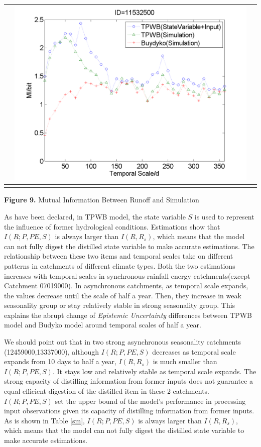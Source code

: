 \documentclass[draft,wrr]{AGUTeX}
\begin{document}
\begin{article}
\begin{table}[H]
{\begin{tabular}{ccc}
&\begin{minipage}{.6\textwidth}\includegraphics[width=\linewidth]{resultgraph/11532500MI.png}\end{minipage}
\\
\hline
\\
\end{tabular}
}
\Large{\textbf{Figure 9.} Mutual Information Between Runoff and Simulation}
\end{table}

As have been declared, in TPWB model,  the state variable $S$ is used to  represent the influence of former hydrological conditions. Estimations show that $I(R;P,PE,S)$ is always larger than $I(R,R_s)$, which means that 
the model can not fully  digest the distilled state variable to make accurate estimations. The relationship between these two items and temporal scales take on different patterns in catchments of different climate types. Both the two estimations increases with temporal scales in synchronous rainfall energy catchments(except Catchment 07019000). In asynchronous catchments, as temporal scale expands, the values decrease until the scale of half a year. Then, they increase in weak seasonality group or stay relatively stable in strong seasonality group. This explains the abrupt change of \emph{Epistemic Uncertainty} differences between TPWB model and Budyko model around temporal scales of half a year. 

We should point out that in two strong asynchronous seasonality catchments (12459000,13337000), although $I(R;P,PE,S)$ decreases as temporal scale expands from 10 days to half a year, $I(R,R_s)$ is much smaller than $I(R;P,PE,S)$. It stays low and relatively stable as temporal scale expands. The strong  capacity of distilling information from former inputs does not guarantee a equal efficient digestion of the distilled item in these 2 catchments. 
\iffalse
$I(R;P,PE,S)$ set the upper bound of the model's performance in processing input observations given its capacity of distilling information from former inputs. As is shown in Table \ref{sm}, $I(R;P,PE,S)$ is always larger than $I(R,R_s)$, which means that the model can not fully  digest the distilled state variable to make accurate estimations. 



\end{article}
\end{document}
